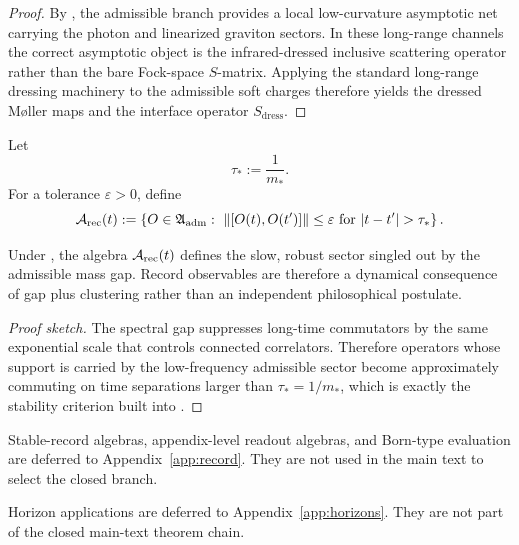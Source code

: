 \begin{proof}
By , the admissible branch
provides a local low-curvature asymptotic net carrying the photon and linearized graviton sectors.
In these long-range channels the correct asymptotic object is the infrared-dressed inclusive
scattering operator rather than the bare Fock-space $S$-matrix. Applying the standard long-range
dressing machinery to the admissible soft charges therefore yields the dressed M\o ller maps and
the interface operator $S_{\mathrm{dress}}$.
\end{proof}

\begin{definition}
\label{def:stable-record-algebra}
Let
\[
\tau_*:=\frac{1}{m_*}.
\]
For a tolerance $\varepsilon>0$, define
\[
\Arec(t)
:=
\left\{
O\in\mathfrak A_{\mathrm{adm}}
:\ \|[O(t),O(t')]\|\le\varepsilon
\text{ for } |t-t'|>\tau_*
\right\}.
\]
\end{definition}

\begin{proposition}
Under , the algebra $\mathcal A_{\mathrm{rec}}(t)$ defines the slow, robust sector singled out by the admissible mass gap. Record observables are therefore a dynamical consequence of gap plus clustering rather than an independent philosophical postulate.
\end{proposition}

\begin{proof}[Proof sketch]
The spectral gap suppresses long-time commutators by the same exponential scale that controls connected correlators. Therefore operators whose support is carried by the low-frequency admissible sector become approximately commuting on time separations larger than $\tau_*=1/m_*$, which is exactly the stability criterion built into .
\end{proof}

\begin{remark}
Stable-record algebras, appendix-level readout algebras, and Born-type evaluation are deferred to
Appendix~\ref{app:record}. They are not used in the main text to select the closed branch.
\end{remark}

\begin{remark}
Horizon applications are deferred to Appendix~\ref{app:horizons}. They are not part of the closed
main-text theorem chain.
\end{remark}

